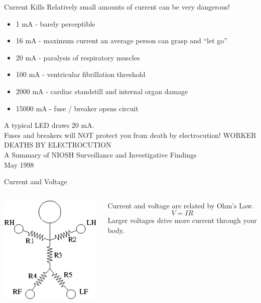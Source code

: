 \documentclass{presentation}
\begin{document}
\begin{frame}{Current Kills}
  Relatively small amounts of current can be very dangerous!
  \begin{itemize}
    \item 1 mA - barely perceptible
    \item 16 mA - maximum current an average person can grasp and ``let go''
    \item 20 mA - paralysis of respiratory muscles
    \item 100 mA - ventricular fibrillation threshold
    \item 2000 mA - cardiac standstill and internal organ damage
    \item 15000 mA - fuse / breaker opens circuit
  \end{itemize}
  A typical LED draws 20 mA. \\
  Fuses and breakers will NOT protect you from death by electrocution!
  \vfill
  \tiny
  WORKER DEATHS BY ELECTROCUTION \\
  A Summary of NIOSH Surveillance and Investigative Findings \\
  May 1998
\end{frame}

\begin{frame}{Current and Voltage}
  \begin{columns}
    \begin{column}{0.33\textwidth}
      \includegraphics[width=\textwidth]{"./resistor-person.png"}
    \end{column}
    \begin{column}{0.67\textwidth}
      Current and voltage are related by Ohm's Law.
      \begin{equation*}
        V = IR
      \end{equation*}
      Larger voltages drive more current through your body.
    \end{column}
  \end{columns}
\end{frame}
\end{document}
